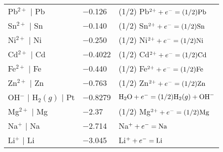 {{\begin{tabular}{lll}
Pb$^{2+}$ $|$ Pb & $-$0.126 & (1/2) Pb$^{2+} + e^- = (1/2) \textnormal{Pb}$\\
Sn$^{2+}$ $|$ Sn & $-$0.140 & (1/2) Sn$^{2+} + e^- = (1/2) \textnormal{Sn}$\\
Ni$^{2+}$ $|$ Ni & $-$0.250 & (1/2) Ni$^{2+} + e^- = (1/2) \textnormal{Ni}$\\
Cd$^{2+}$ $|$ Cd & $-$0.4022 & (1/2) Cd$^{2+} + e^- = (1/2) \textnormal{Cd}$\\
Fe$^{2+}$ $|$ Fe & $-$0.440 & (1/2) Fe$^{2+} + e^- = (1/2) \textnormal{Fe}$\\
Zn$^{2+}$ $|$ Zn & $-$0.763 & (1/2) Zn$^{2+} + e^- = (1/2) \textnormal{Zn}$\\
OH$^-$ $|$ H$_2(g)$ $|$ Pt & $-$0.8279 & $\textnormal{H}_2\textnormal{O} + e^- = (1/2) \textnormal{H}_2(g) + \textnormal{OH}^-$\\
Mg$^{2+}$ $|$ Mg & $-$2.37 & (1/2) Mg$^{2+} + e^- = (1/2) \textnormal{Mg}$\\
Na$^+$ $|$ Na & $-$2.714 & Na$^+ + e^- = \textnormal{Na}$\\
Li$^+$ $|$ Li & $-$3.045 & Li$^+ + e^- = \textnormal{Li}$\\
\end{tabular}
}

}

